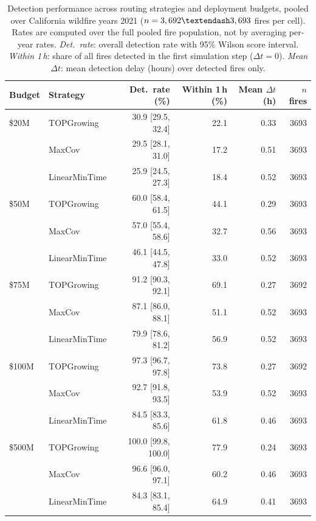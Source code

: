 \begin{table}[!t]
\caption{Detection performance across routing strategies and deployment budgets,
  pooled over California wildfire years 2021 (\(n = 3,692\textendash3,693\) fires per cell).
  Rates are computed over the full pooled fire population, not by averaging per-year rates.
  \emph{Det.\ rate}: overall detection rate with 95\% Wilson score interval.
  \emph{Within 1\,h}: share of all fires detected in the first simulation step (\(\Delta t = 0\)).
  \emph{Mean $\Delta t$}: mean detection delay (hours) over detected fires only.}
\label{tab:detection}
\begin{tabular}{@{}llrrrr@{}}
\toprule
Budget & Strategy & Det.\ rate (\%) & Within 1\,h (\%) & Mean $\Delta t$ (h) & $n$ fires \\
\midrule
\$20M & TOPGrowing     & 30.9 [29.5, 32.4] & 22.1 & 0.33 & 3693 \\
 & MaxCov         & 29.5 [28.1, 31.0] & 17.2 & 0.51 & 3693 \\
 & LinearMinTime  & 25.9 [24.5, 27.3] & 18.4 & 0.52 & 3693 \\
\addlinespace
\$50M & TOPGrowing     & 60.0 [58.4, 61.5] & 44.1 & 0.29 & 3693 \\
 & MaxCov         & 57.0 [55.4, 58.6] & 32.7 & 0.56 & 3693 \\
 & LinearMinTime  & 46.1 [44.5, 47.8] & 33.0 & 0.52 & 3693 \\
\addlinespace
\$75M & TOPGrowing     & 91.2 [90.3, 92.1] & 69.1 & 0.27 & 3692 \\
 & MaxCov         & 87.1 [86.0, 88.1] & 51.1 & 0.52 & 3693 \\
 & LinearMinTime  & 79.9 [78.6, 81.2] & 56.9 & 0.52 & 3693 \\
\addlinespace
\$100M & TOPGrowing     & 97.3 [96.7, 97.8] & 73.8 & 0.27 & 3692 \\
 & MaxCov         & 92.7 [91.8, 93.5] & 53.9 & 0.52 & 3693 \\
 & LinearMinTime  & 84.5 [83.3, 85.6] & 61.8 & 0.46 & 3693 \\
\addlinespace
\$500M & TOPGrowing     & 100.0 [99.8, 100.0] & 77.9 & 0.24 & 3693 \\
 & MaxCov         & 96.6 [96.0, 97.1] & 60.2 & 0.46 & 3693 \\
 & LinearMinTime  & 84.3 [83.1, 85.4] & 64.9 & 0.41 & 3693 \\
\bottomrule
\end{tabular}
\end{table}
